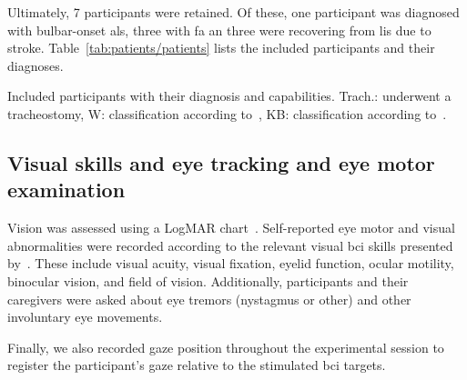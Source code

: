 \documentclass[twocolumn]{article}
\newcommand{\skill}{{\color{gdvGreen}{$\boldsymbol{+}$}}}
\newcommand{\noskill}{{\color{gdvOrange}{$\boldsymbol{-}$}}}
\newcommand{\snoskill}{{\color{gdvRed}{$\boldsymbol{/}$}}}
\begin{document}
Ultimately, 7 participants were retained.
Of these, one participant was diagnosed with bulbar-onset \ac{als}, three with
\ac{fa} an three were recovering from \ac{lis} due to stroke.
Table~\ref{tab:patients/patients} lists the included participants and their
diagnoses.
\begin{table}[t]
  \centering
  \footnotesize
  
  \caption[Included participants with their diagnosis and
    capabilities.]{Included participants with their diagnosis and
    capabilities.
    Trach.: underwent a tracheostomy, W: classification according
    to~\textcite{Wolpaw2006}, KB: classification according
    to~\textcite{Kuebler2008}.
  }
  \label{tab:patients/patients}
\end{table}

\subsection{Visual skills and eye tracking and eye motor examination}

Vision was assessed using a LogMAR chart~\cite{Bailey1976}.
Self-reported eye motor and visual abnormalities were recorded according to the
relevant visual \ac{bci} skills presented by~\textcite{FriedOken2020}.
These include visual acuity, visual fixation, eyelid function, ocular motility,
binocular vision, and field of vision.
Additionally, participants and their caregivers were asked about eye tremors
(nystagmus or other) and other involuntary eye movements.


\begin{table}[t]
  \footnotesize
  \centering
  
  \caption[Visual skills of the included participants.]{%
    Self-reported visual skills as defined by \textcite{FriedOken2020} of the included participants.
  \skill\ skilled, \noskill\ impaired, \snoskill\ severely impaired.
  Visual acuity was assessed using the logMAR scale (lower is better).}
  \label{tab:patients/eye}
\end{table}

Finally, we also recorded gaze position throughout the experimental session to
register the participant's gaze relative to the stimulated \ac{bci} targets.
\end{document}
